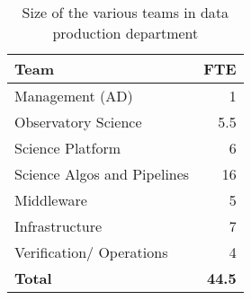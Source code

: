  \begin{longtable} { |p{}  |r |} 
\caption{Size of the various teams in data production department \label{tab:FTE}}\\ 
\hline 
{Team}&{FTE } \\ \hline
{Management (AD)}&{1} \\ \hline
{Observatory Science }&{5.5} \\ \hline
{Science Platform}&{6} \\ \hline
{Science Algos and Pipelines}&{16} \\ \hline
{Middleware}&{5} \\ \hline
{Infrastructure}&{7} \\ \hline
{Verification/ Operations}&{4} \\ \hline
\textbf{Total}&\textbf{44.5} \\ \hline
\end{longtable}
